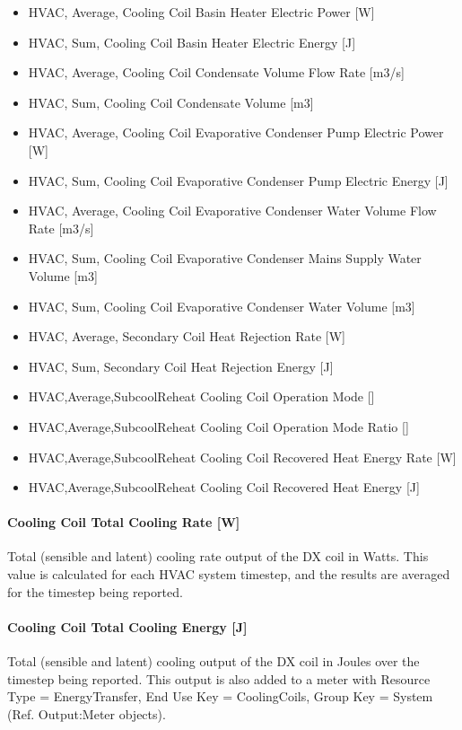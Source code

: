\begin{itemize}
\item HVAC, Average, Cooling Coil Basin Heater Electric Power {[}W{]}
\item HVAC, Sum, Cooling Coil Basin Heater Electric Energy {[}J{]}
\item HVAC, Average, Cooling Coil Condensate Volume Flow Rate {[}m3/s{]}
\item HVAC, Sum, Cooling Coil Condensate Volume {[}m3{]}
\item HVAC, Average, Cooling Coil Evaporative Condenser Pump Electric Power {[}W{]}
\item HVAC, Sum, Cooling Coil Evaporative Condenser Pump Electric Energy {[}J{]}
\item HVAC, Average, Cooling Coil Evaporative Condenser Water Volume Flow Rate {[}m3/s{]}
\item HVAC, Sum, Cooling Coil Evaporative Condenser Mains Supply Water Volume {[}m3{]}
\item HVAC, Sum, Cooling Coil Evaporative Condenser Water Volume {[}m3{]}
\item HVAC, Average, Secondary Coil Heat Rejection Rate {[}W{]}
\item HVAC, Sum, Secondary Coil Heat Rejection Energy {[}J{]}
\item
  HVAC,Average,SubcoolReheat Cooling Coil Operation Mode {[]}
\item
  HVAC,Average,SubcoolReheat Cooling Coil Operation Mode Ratio {[]}
\item
  HVAC,Average,SubcoolReheat Cooling Coil Recovered Heat Energy Rate {[}W{]}
\item
  HVAC,Average,SubcoolReheat Cooling Coil Recovered Heat Energy {[}J{]}
\end{itemize}

\paragraph{Cooling Coil Total Cooling Rate {[}W{]}}

Total (sensible and latent) cooling rate output of the DX coil in Watts. This value is calculated for each HVAC system timestep, and the results are averaged for the timestep being reported.

\paragraph{Cooling Coil Total Cooling Energy {[}J{]}}

Total (sensible and latent) cooling output of the DX coil in Joules over the timestep being reported. This output is also added to a meter with Resource Type = EnergyTransfer, End Use Key = CoolingCoils, Group Key = System (Ref. Output:Meter objects).

